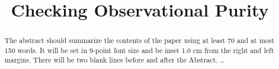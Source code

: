 \documentclass{llncs}
\begin{document}
\mainmatter              %
%
\title{Checking Observational Purity}
%
%

\maketitle              %

\begin{abstract}
The abstract should summarize the contents of the paper
using at least 70 and at most 150 words. It will be set in 9-point
font size and be inset 1.0 cm from the right and left margins.
There will be two blank lines before and after the Abstract. \dots
{}
\end{abstract}
\end{document}
